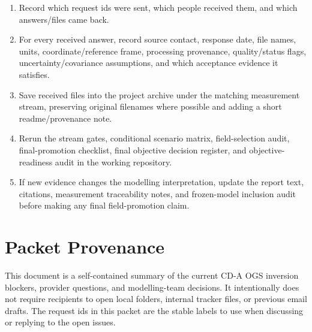 \documentclass[10pt,a4paper]{article}
\begin{document}
\begin{enumerate}
\item Record which request ids were sent, which people received them, and which
answers/files came back.
\item For every received answer, record source contact, response date, file
names, units, coordinate/reference frame, processing provenance, quality/status
flags, uncertainty/covariance assumptions, and which acceptance evidence it
satisfies.
\item Save received files into the project archive under the matching
measurement stream, preserving original filenames where possible and adding a
short readme/provenance note.
\item Rerun the stream gates, conditional scenario matrix, field-selection
audit, final-promotion checklist, final objective decision register, and
objective-readiness audit in the working repository.
\item If new evidence changes the modelling interpretation, update the report
text, citations, measurement traceability notes, and frozen-model inclusion
audit before making any final field-promotion claim.
\end{enumerate}

\section{Packet Provenance}

This document is a self-contained summary of the current CD-A OGS inversion
blockers, provider questions, and modelling-team decisions. It intentionally
does not require recipients to open local folders, internal tracker files, or
previous email drafts. The request ids in this packet are the stable labels to
use when discussing or replying to the open issues.
\end{document}
